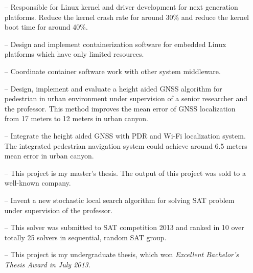 \documentclass[10pt,a4paper,roman]{moderncv}        %
\begin{document}
\begin{itemize}
  \item[--]{Responsible for Linux kernel and driver development for next
    generation platforms. Reduce the kernel crash rate for around 30\% and reduce the kernel boot time for around 40\%.}
  \item[--]{Design and implement containerization software for embedded Linux
    platforms which have only limited resources.}
  \item[--]{Coordinate container software work with other system middleware.}
\end{itemize}

\begin{itemize}
  \item[--]{Design, implement and evaluate a height aided GNSS algorithm for
    pedestrian in urban environment under supervision of a senior researcher
  and the professor. This method improves the mean error of GNSS localization from 17 meters to 12 meters in urban canyon.}
  \item[--]{Integrate the height aided GNSS with PDR and Wi-Fi localization system. The integrated pedestrian navigation system could achieve around 6.5 meters mean error in urban canyon.}
  \item[--]{This project is my master's thesis. The output of this project was sold to a well-known company.}
\end{itemize}

\begin{itemize}
  \item[--]{Invent a new stochastic local search algorithm for solving SAT problem under supervision of the professor.}
  \item[--]{This solver was submitted to SAT competition 2013 and ranked in 10 over totally 25 solvers in sequential, random SAT group.}
  \item[--]{This project is my undergraduate thesis, which won \em{Excellent
Bachelor's Thesis Award} in July 2013.}
\end{itemize}
\end{document}
